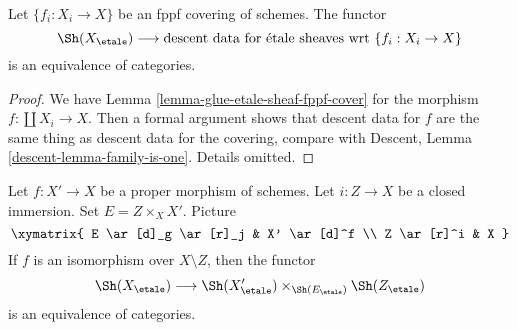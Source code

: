 \begin{lemma}
\label{lemma-glue-etale-sheaf-fppf}
Let $\{f_i : X_i \to X\}$ be an fppf covering of schemes.
The functor
$$
\Sh(X_\etale)
\longrightarrow
\text{descent data for \'etale sheaves wrt }\{f_i : X_i \to X\}
$$
is an equivalence of categories.
\end{lemma}

\begin{proof}
We have Lemma \ref{lemma-glue-etale-sheaf-fppf-cover}
for the morphism $f : \coprod X_i \to X$.
Then a formal argument shows that descent data for $f$
are the same thing as descent data for the covering, compare
with Descent, Lemma \ref{descent-lemma-family-is-one}.
Details omitted.
\end{proof}

\begin{lemma}
\label{lemma-glue-etale-sheaf-modification}
Let $f : X' \to X$ be a proper morphism of schemes. Let $i : Z \to X$
be a closed immersion. Set $E = Z \times_X X'$. Picture
$$
\xymatrix{
E \ar[d]_g \ar[r]_j & X' \ar[d]^f \\
Z \ar[r]^i & X
}
$$
If $f$ is an isomorphism over $X \setminus Z$, then the functor
$$
\Sh(X_\etale)
\longrightarrow
\Sh(X'_\etale) \times_{\Sh(E_\etale)} \Sh(Z_\etale)
$$
is an equivalence of categories.
\end{lemma}

